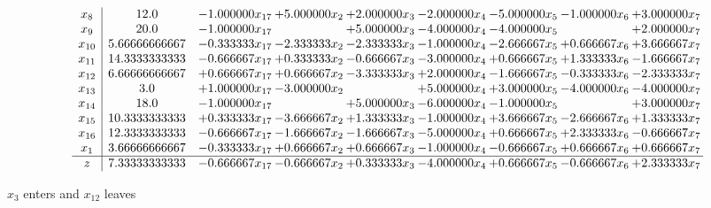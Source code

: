 \documentclass[10pt]{article}
\begin{document}
 \[\begin{array}{c| c c@{\hskip 2pt} c@{\hskip 2pt} c@{\hskip 2pt} c@{\hskip 2pt} c@{\hskip 2pt} c@{\hskip 2pt} c@{\hskip 2pt} }
 x_{8}   &  12.0 & -1.000000 x_{17} & + 5.000000 x_{2} & + 2.000000 x_{3} & -2.000000 x_{4} & -5.000000 x_{5} & -1.000000 x_{6} & + 3.000000 x_{7}\\
 x_{9}   &  20.0 & -1.000000 x_{17} &   & + 5.000000 x_{3} & -4.000000 x_{4} & -4.000000 x_{5} &   & + 2.000000 x_{7}\\
 x_{10}   &  5.66666666667 & -0.333333 x_{17} & -2.333333 x_{2} & -2.333333 x_{3} & -1.000000 x_{4} & -2.666667 x_{5} & + 0.666667 x_{6} & + 3.666667 x_{7}\\
 x_{11}   &  14.3333333333 & -0.666667 x_{17} & + 0.333333 x_{2} & -0.666667 x_{3} & -3.000000 x_{4} & + 0.666667 x_{5} & + 1.333333 x_{6} & -1.666667 x_{7}\\
 x_{12}   &  6.66666666667 & + 0.666667 x_{17} & + 0.666667 x_{2} & -3.333333 x_{3} & + 2.000000 x_{4} & -1.666667 x_{5} & -0.333333 x_{6} & -2.333333 x_{7}\\
 x_{13}   &  3.0 & + 1.000000 x_{17} & -3.000000 x_{2} &   & + 5.000000 x_{4} & + 3.000000 x_{5} & -4.000000 x_{6} & -4.000000 x_{7}\\
 x_{14}   &  18.0 & -1.000000 x_{17} &   & + 5.000000 x_{3} & -6.000000 x_{4} & -1.000000 x_{5} &   & + 3.000000 x_{7}\\
 x_{15}   &  10.3333333333 & + 0.333333 x_{17} & -3.666667 x_{2} & + 1.333333 x_{3} & -1.000000 x_{4} & + 3.666667 x_{5} & -2.666667 x_{6} & + 1.333333 x_{7}\\
 x_{16}   &  12.3333333333 & -0.666667 x_{17} & -1.666667 x_{2} & -1.666667 x_{3} & -5.000000 x_{4} & + 0.666667 x_{5} & + 2.333333 x_{6} & -0.666667 x_{7}\\
 x_{1}   &  3.66666666667 & -0.333333 x_{17} & + 0.666667 x_{2} & + 0.666667 x_{3} & -1.000000 x_{4} & -0.666667 x_{5} & + 0.666667 x_{6} & + 0.666667 x_{7}\\
\hline
z    &  7.33333333333 & -0.666667 x_{17} & -0.666667 x_{2} & + 0.333333 x_{3} & -4.000000 x_{4} & + 0.666667 x_{5} & -0.666667 x_{6} & + 2.333333 x_{7}\\
\end{array}\]


 $ x_{3} $ enters and $ x_{12} $ leaves 
\end{document}
